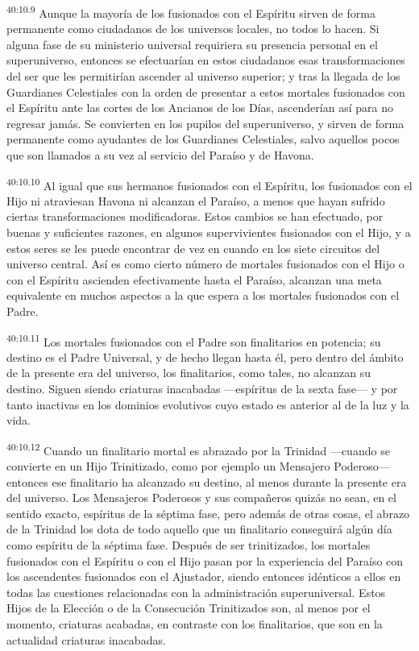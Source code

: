 \par
\textsuperscript{40:10.9} Aunque la mayoría de los fusionados con el Espíritu sirven de forma permanente como ciudadanos de los universos locales, no todos lo hacen. Si alguna fase de su ministerio universal requiriera su presencia personal en el superuniverso, entonces se efectuarían en estos ciudadanos esas transformaciones del ser que les permitirían ascender al universo superior; y tras la llegada de los Guardianes Celestiales con la orden de presentar a estos mortales fusionados con el Espíritu ante las cortes de los Ancianos de los Días, ascenderían así para no regresar jamás. Se convierten en los pupilos del superuniverso, y sirven de forma permanente como ayudantes de los Guardianes Celestiales, salvo aquellos pocos que son llamados a su vez al servicio del Paraíso y de Havona.

\par
\textsuperscript{40:10.10} Al igual que sus hermanos fusionados con el Espíritu, los fusionados con el Hijo ni atraviesan Havona ni alcanzan el Paraíso, a menos que hayan sufrido ciertas transformaciones modificadoras. Estos cambios se han efectuado, por buenas y suficientes razones, en algunos supervivientes fusionados con el Hijo, y a estos seres se les puede encontrar de vez en cuando en los siete circuitos del universo central. Así es como cierto número de mortales fusionados con el Hijo o con el Espíritu ascienden efectivamente hasta el Paraíso, alcanzan una meta equivalente en muchos aspectos a la que espera a los mortales fusionados con el Padre.

\par
\textsuperscript{40:10.11} Los mortales fusionados con el Padre son finalitarios en potencia; su destino es el Padre Universal, y de hecho llegan hasta él, pero dentro del ámbito de la presente era del universo, los finalitarios, como tales, no alcanzan su destino. Siguen siendo criaturas inacabadas ---espíritus de la sexta fase--- y por tanto inactivas en los dominios evolutivos cuyo estado es anterior al de la luz y la vida.

\par
\textsuperscript{40:10.12} Cuando un finalitario mortal es abrazado por la Trinidad ---cuando se convierte en un Hijo Trinitizado, como por ejemplo un Mensajero Poderoso--- entonces ese finalitario ha alcanzado su destino, al menos durante la presente era del universo. Los Mensajeros Poderosos y sus compañeros quizás no sean, en el sentido exacto, espíritus de la séptima fase, pero además de otras cosas, el abrazo de la Trinidad los dota de todo aquello que un finalitario conseguirá algún día como espíritu de la séptima fase. Después de ser trinitizados, los mortales fusionados con el Espíritu o con el Hijo pasan por la experiencia del Paraíso con los ascendentes fusionados con el Ajustador, siendo entonces idénticos a ellos en todas las cuestiones relacionadas con la administración superuniversal. Estos Hijos de la Elección o de la Consecución Trinitizados son, al menos por el momento, criaturas acabadas, en contraste con los finalitarios, que son en la actualidad criaturas inacabadas.

